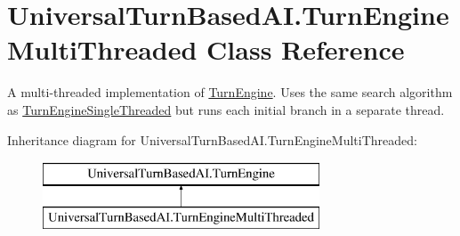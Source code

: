 \hypertarget{class_universal_turn_based_a_i_1_1_turn_engine_multi_threaded}{}\section{Universal\+Turn\+Based\+A\+I.\+Turn\+Engine\+Multi\+Threaded Class Reference}
\label{class_universal_turn_based_a_i_1_1_turn_engine_multi_threaded}


A multi-\/threaded implementation of \hyperlink{class_universal_turn_based_a_i_1_1_turn_engine}{Turn\+Engine}. Uses the same search algorithm as \hyperlink{class_universal_turn_based_a_i_1_1_turn_engine_single_threaded}{Turn\+Engine\+Single\+Threaded} but runs each initial branch in a separate thread.  


Inheritance diagram for Universal\+Turn\+Based\+A\+I.\+Turn\+Engine\+Multi\+Threaded\+:\begin{figure}[H]
\begin{center}
\leavevmode
\includegraphics[height=2.000000cm]{class_universal_turn_based_a_i_1_1_turn_engine_multi_threaded}
\end{center}
\end{figure}
